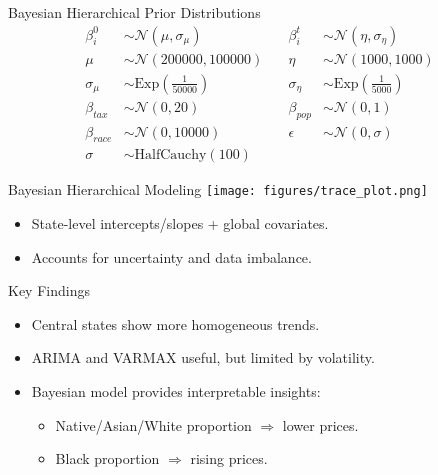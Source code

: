 \documentclass{beamer}
\begin{document}
\begin{frame}{Bayesian Hierarchical Prior Distributions}
\begin{align*}
\beta_i^0 &\sim \mathcal{N}(\mu, \sigma_\mu) & \quad \beta_i^t &\sim \mathcal{N}(\eta, \sigma_\eta) \\
\mu &\sim \mathcal N (200000, 100000) & \quad \eta &\sim \mathcal N (1000, 1000) \\
\sigma_{\mu} &\sim \text{Exp}\left(\frac{1}{50000}\right) & \quad \sigma_{\eta} &\sim \text{Exp}\left(\frac{1}{5000}\right) \\
\beta_{tax} &\sim \mathcal{N}(0, 20) & \quad \beta_{pop} &\sim \mathcal{N}(0, 1) \\
\beta_{race} &\sim \mathcal{N}(0, 10000) & \quad \epsilon &\sim \mathcal N (0, \sigma) \\
\sigma &\sim \text{HalfCauchy}(100)
\end{align*}
\end{frame}


\begin{frame}{Bayesian Hierarchical Modeling} 
  \texttt{[image: figures/trace\_plot.png]}
  \begin{itemize}%
    \item State-level intercepts/slopes + global covariates.
    \item Accounts for uncertainty and data imbalance.
  \end{itemize}
\end{frame}




\begin{frame}{Key Findings} 
  \begin{itemize}%
    \item Central states show more homogeneous trends.
    \item ARIMA and VARMAX useful, but limited by volatility.
    \item Bayesian model provides interpretable insights:
    \begin{itemize}%
      \item Native/Asian/White proportion $\Rightarrow$ lower prices.
      \item Black proportion $\Rightarrow$ rising prices.
    \end{itemize}
  \end{itemize}
\end{frame}
\end{document}
